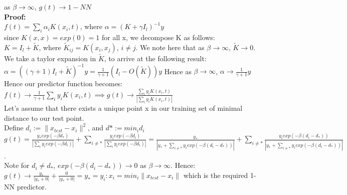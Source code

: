 \documentclass[12pt]{article}
\begin{document}
\begin{enumerate}[leftmargin=\labelsep]
    as $\beta \to \infty$, $g(t) \to 1-NN$\\
    
    \textbf{Proof:}\\
    
    $f(t) = \sum_{i} \alpha_{i} K(x_{i}, t)$, where $ \alpha = (K + \gamma I_{l})^{-1} y$\\
    
    since $K(x,x) = exp(0) = 1$ for  all x, we decompose K as follows:\\
    
    $K = I_{l} + \tilde{K}$, where $\tilde{K}_{ij} = K(x_i, x_j)$, $i \ne j$. We note here that as $\beta \to \infty$, $\tilde{K} \to 0$.\\
    
    We take a taylor expansion in $\tilde{K}$, to arrive at the following result:\\

    $\alpha = ((\gamma+1) I_{l} + \tilde{K})^{-1} y = \frac{1}{\gamma + 1} (I_{l} - O(\tilde{K})) y $
    Hence as $\beta \to \infty$, $\alpha \to \frac{1}{\gamma +1}y$\\
    Hence our predictor function becomes:\\
    $f(t) \to \frac{1}{\gamma+1} \sum_{i} y_{i} K(x_{i}, t) \implies g(t)  \to \frac{\sum_{i} y_{i} K(x_{i}, t)}{|\sum_{i} y_{i} K(x_{i}, t)|}
    $\\

    Let's assume that there exists a unique point x in our training set of minimal distance to our test point.\\
    Define $d_{i} := \|x_{test} - x_{i}\|^{2}$, and $d* := min_{i} d_{i}$\\
    $g(t) = \frac{y_{*} exp(-\beta d_{*})}{|\sum_{i} y_{i} exp(-\beta d_{i})|} + \sum_{i\ne *}\frac{y_{i} exp(-\beta d_{i})}{|\sum_{i} y_{i} exp(-\beta 
    d_{i})|} = \frac{y_{*}}{|y_{*} + \sum_{i \ne *} y_{i} exp(-\beta (d_{i} - d_{*}))|} + \sum_{i\ne *}\frac{y_{i} exp(-\beta (d_{i} - d_{*}))}{|y_{*} + \sum_{i \ne *} y_{i} exp(-\beta (d_{i} - d_{*}))|}$.\\
    
    Note for $d_{i} \ne d_{*}$, $exp(-\beta(d_{i} - d_{*})) \to 0$ as $\beta \to \infty$. Hence:\\
    $g(t) \to \frac{y_{*}}{|y_{*} + 0|} + \frac{0}{|y_{*} + 0|} = y_{*} = y_{i} : x_{i} = min_{i} \|x_{test} - x_{i}\|$ which is the required 1-NN predictor.\\
    

\end{enumerate}
\end{document}
